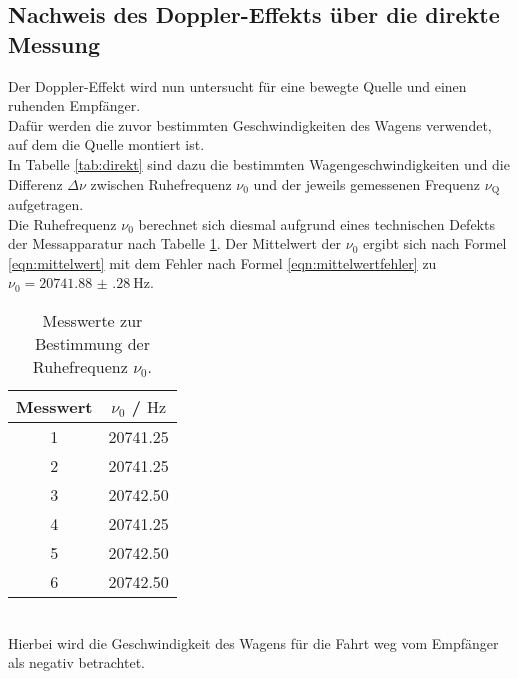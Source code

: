 \subsection{Nachweis des Doppler-Effekts über die direkte Messung}
Der Doppler-Effekt wird nun untersucht für eine bewegte Quelle und einen ruhenden Empfänger.\\
Dafür werden die zuvor bestimmten Geschwindigkeiten des Wagens verwendet, auf dem die Quelle montiert ist.\\
In Tabelle \ref{tab:direkt} sind dazu die bestimmten Wagengeschwindigkeiten und die Differenz $\Delta \nu$ zwischen Ruhefrequenz $\nu_\mathrm{0}$ und der jeweils gemessenen Frequenz $\nu_{\mathrm{Q}}$ aufgetragen.\\
Die Ruhefrequenz $\nu_{\mathrm{0}}$ berechnet sich diesmal aufgrund eines technischen Defekts der Messapparatur nach Tabelle \ref{tab:ruhefr}.
Der Mittelwert der $\nu_0$ ergibt sich nach Formel \ref{eqn:mittelwert} mit dem Fehler nach Formel \ref{eqn:mittelwertfehler} zu $\nu_0=\SI{20741.88(28)}{\Hz}$.
\begin{table}
	\centering
	\caption{Messwerte zur Bestimmung der Ruhefrequenz $\nu_0$.}
	\label{tab:ruhefr}
	\begin{tabular}{cc}
		\toprule
		Messwert & $\nu_0$ / $\si{\hertz}$ \\
		\midrule
		1        & 20741.25                \\
		2        & 20741.25                \\
		3        & 20742.50                \\
		4        & 20741.25                \\
		5        & 20742.50                \\
		6        & 20742.50                \\
		\bottomrule
	\end{tabular}
\end{table}
\\
Hierbei wird die Geschwindigkeit des Wagens für die Fahrt weg vom Empfänger als negativ betrachtet.
